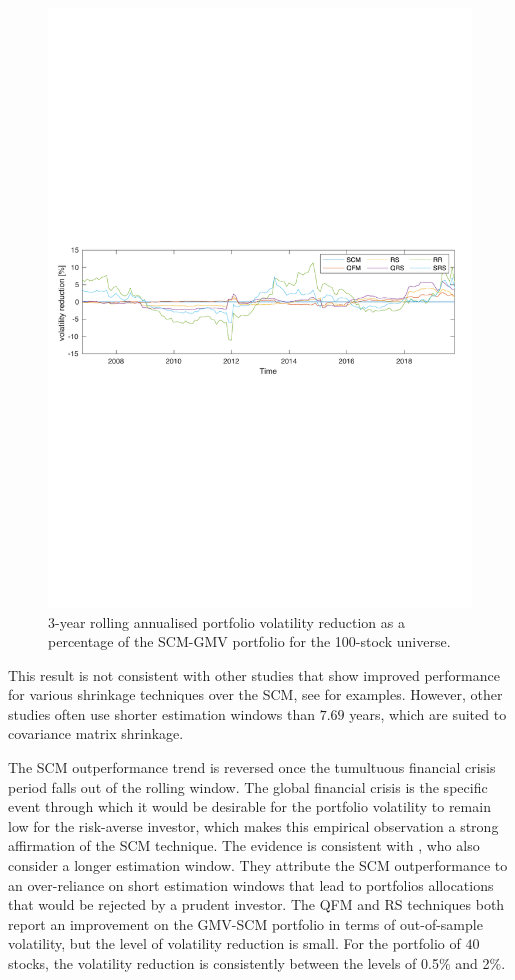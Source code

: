 \documentclass[a4paper,11pt,nocenter,bold,noupper,headcount]{mythesis}
\theoremstyle{plain}
\theoremstyle{definition}
\begin{document}
\begin{figure}[H]
\includegraphics[width=14.5cm]{n100_3_yr_roll_vol.pdf}
\caption{3-year rolling annualised portfolio volatility reduction as a percentage of the SCM-GMV portfolio for the 100-stock universe.}
\label{GMV_comp_100}
\end{figure}

This result is not consistent with other studies that show improved performance for various shrinkage techniques over the SCM, see \cite{GF14} for examples. However, other studies often use shorter estimation windows than $7.69$ years, which are suited to covariance matrix shrinkage. 

The SCM outperformance trend is reversed once the tumultuous financial crisis period falls out of the rolling window. The global financial crisis is the specific event through which it would be desirable for the portfolio volatility to remain low for the risk-averse investor, which makes this empirical observation a strong affirmation of the SCM technique. The evidence is consistent with \cite{K10}, who also consider a longer estimation window. They attribute the SCM outperformance to an over-reliance on short estimation windows that lead to portfolios allocations that would be rejected by a prudent investor. The QFM and RS techniques both report an improvement on the GMV-SCM portfolio in terms of out-of-sample volatility, but the level of volatility reduction is small. For the portfolio of $40$ stocks, the volatility reduction is consistently between the levels of 0.5\% and 2\%.
\end{document}
